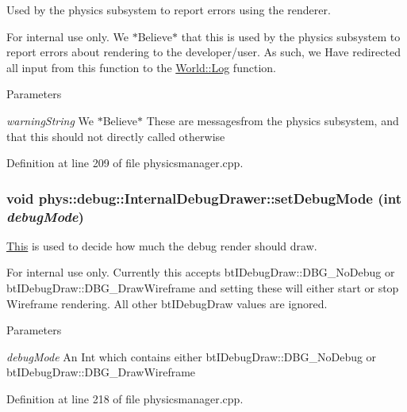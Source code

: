 Used by the physics subsystem to report errors using the renderer. 

\begin{DoxyInternal}{For internal use only.}
We $\ast$Believe$\ast$ that this is used by the physics subsystem to report errors about rendering to the developer/user. As such, we Have redirected all input from this function to the \hyperlink{classphys_1_1World_a05267a20e8d5518771d0848190b33d60}{World::Log} function. 
\begin{DoxyParams}{Parameters}
\item[{\em warningString}]We $\ast$Believe$\ast$ These are messagesfrom the physics subsystem, and that this should not directly called otherwise \end{DoxyParams}
\end{DoxyInternal}


Definition at line 209 of file physicsmanager.cpp.

\hypertarget{classphys_1_1debug_1_1InternalDebugDrawer_a63059b273ed6031a393b2d994b820bcc}{
\subsubsection[{setDebugMode}]{\setlength{\rightskip}{0pt plus 5cm}void phys::debug::InternalDebugDrawer::setDebugMode (int {\em debugMode})}}
\label{db/d27/classphys_1_1debug_1_1InternalDebugDrawer_a63059b273ed6031a393b2d994b820bcc}


\hyperlink{structThis}{This} is used to decide how much the debug render should draw. 

\begin{DoxyInternal}{For internal use only.}
Currently this accepts btIDebugDraw::DBG\_\-NoDebug or btIDebugDraw::DBG\_\-DrawWireframe and setting these will either start or stop Wireframe rendering. All other btIDebugDraw values are ignored. 
\begin{DoxyParams}{Parameters}
\item[{\em debugMode}]An Int which contains either btIDebugDraw::DBG\_\-NoDebug or btIDebugDraw::DBG\_\-DrawWireframe \end{DoxyParams}
\end{DoxyInternal}


Definition at line 218 of file physicsmanager.cpp.

